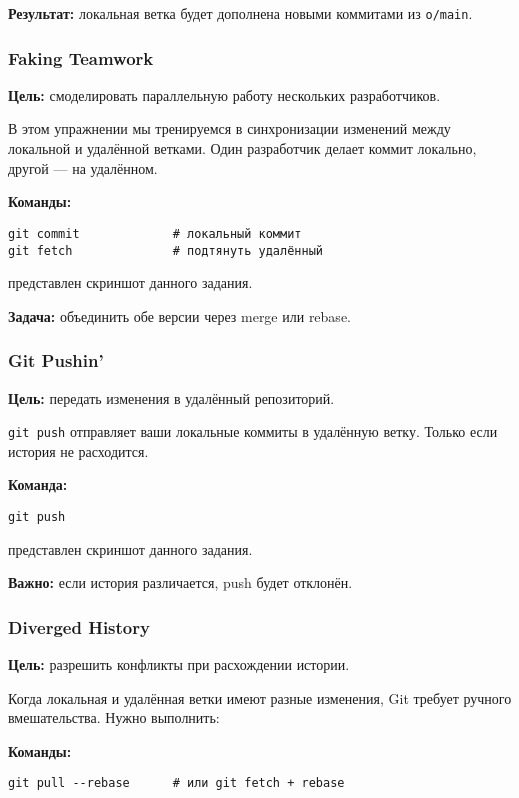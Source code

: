 \documentclass[a4paper,12pt]{report}
\begin{document}
\textbf{Результат:} локальная ветка будет дополнена новыми коммитами из \texttt{o/main}.

\subsubsection{Faking Teamwork}
\textbf{Цель:} смоделировать параллельную работу нескольких разработчиков.

В этом упражнении мы тренируемся в синхронизации изменений между локальной и удалённой ветками. Один разработчик делает коммит локально, другой — на удалённом.

\textbf{Команды:}
\begin{verbatim}
git commit             # локальный коммит
git fetch              # подтянуть удалённый
\end{verbatim}

 представлен скриншот данного задания.

\textbf{Задача:} объединить обе версии через merge или rebase.

\subsubsection{Git Pushin'}
\textbf{Цель:} передать изменения в удалённый репозиторий.

\texttt{git push} отправляет ваши локальные коммиты в удалённую ветку. Только если история не расходится.

\textbf{Команда:}
\begin{verbatim}
git push
\end{verbatim}

 представлен скриншот данного задания.

\textbf{Важно:} если история различается, push будет отклонён.

\subsubsection{Diverged History}
\textbf{Цель:} разрешить конфликты при расхождении истории.

Когда локальная и удалённая ветки имеют разные изменения, Git требует ручного вмешательства. Нужно выполнить:

\textbf{Команды:}
\begin{verbatim}
git pull --rebase      # или git fetch + rebase
\end{verbatim}
\end{document}

